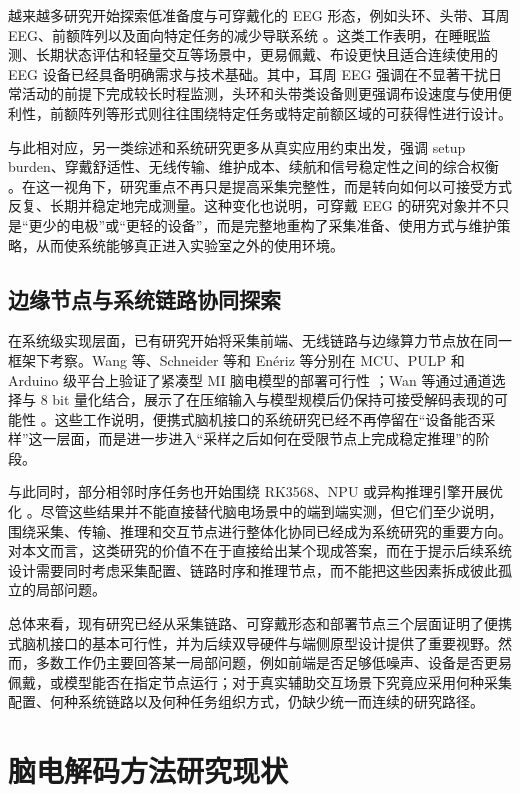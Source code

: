 越来越多研究开始探索低准备度与可穿戴化的 EEG 形态，例如头环、头带、耳周 EEG、前额阵列以及面向特定任务的减少导联系统 \cite{Arn20, Deb15, Bio22}。这类工作表明，在睡眠监测、长期状态评估和轻量交互等场景中，更易佩戴、布设更快且适合连续使用的 EEG 设备已经具备明确需求与技术基础。其中，耳周 EEG 强调在不显著干扰日常活动的前提下完成较长时程监测，头环和头带类设备则更强调布设速度与使用便利性，前额阵列等形式则往往围绕特定任务或特定前额区域的可获得性进行设计。

与此相对应，另一类综述和系统研究更多从真实应用约束出发，强调 setup burden、穿戴舒适性、无线传输、维护成本、续航和信号稳定性之间的综合权衡 \cite{Cas19c, Nis22, He23}。在这一视角下，研究重点不再只是提高采集完整性，而是转向如何以可接受方式反复、长期并稳定地完成测量。这种变化也说明，可穿戴 EEG 的研究对象并不只是“更少的电极”或“更轻的设备”，而是完整地重构了采集准备、使用方式与维护策略，从而使系统能够真正进入实验室之外的使用环境。

\subsection{边缘节点与系统链路协同探索}

在系统级实现层面，已有研究开始将采集前端、无线链路与边缘算力节点放在同一框架下考察。Wang 等、Schneider 等和 En\'eriz 等分别在 MCU、PULP 和 Arduino 级平台上验证了紧凑型 MI 脑电模型的部署可行性 \cite{Wan20, Sch20, Ene23}；Wan 等通过通道选择与 8 bit 量化结合，展示了在压缩输入与模型规模后仍保持可接受解码表现的可能性 \cite{Wan22b}。这些工作说明，便携式脑机接口的系统研究已经不再停留在“设备能否采样”这一层面，而是进一步进入“采样之后如何在受限节点上完成稳定推理”的阶段。

与此同时，部分相邻时序任务也开始围绕 RK3568、NPU 或异构推理引擎开展优化 \cite{You24, Ism23}。尽管这些结果并不能直接替代脑电场景中的端到端实测，但它们至少说明，围绕采集、传输、推理和交互节点进行整体化协同已经成为系统研究的重要方向。对本文而言，这类研究的价值不在于直接给出某个现成答案，而在于提示后续系统设计需要同时考虑采集配置、链路时序和推理节点，而不能把这些因素拆成彼此孤立的局部问题。

总体来看，现有研究已经从采集链路、可穿戴形态和部署节点三个层面证明了便携式脑机接口的基本可行性，并为后续双导硬件与端侧原型设计提供了重要视野。然而，多数工作仍主要回答某一局部问题，例如前端是否足够低噪声、设备是否更易佩戴，或模型能否在指定节点运行；对于真实辅助交互场景下究竟应采用何种采集配置、何种系统链路以及何种任务组织方式，仍缺少统一而连续的研究路径。

\section{脑电解码方法研究现状}

